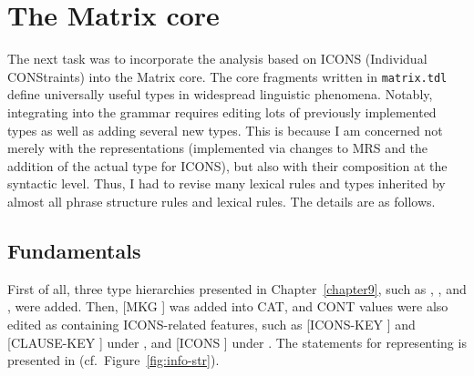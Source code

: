 \section{The Matrix core}
\label{11:sec:matrix}




The next task was to incorporate the analysis based on ICONS
(Individual CONStraints) into the Matrix
core. The core  fragments written in \texttt{matrix.tdl}
define universally useful types in widespread linguistic phenomena.
Notably, integrating  into the grammar requires editing
lots of previously implemented types as well as adding several new
types. This is because I am concerned not merely with the
representations (implemented via changes to MRS and the addition of
the actual type for ICONS), but also with their composition at
the syntactic level.  Thus, I had to revise many lexical rules and
types inherited by almost all phrase structure rules and lexical
rules.  The details are as follows.




\subsection{Fundamentals}
\label{11:ssec:fundamentals}


First of all, three type hierarchies presented in
Chapter~\ref{chapter9}, such as , , and
, were
added.
Then, [MKG ] was added into CAT, and CONT values were also
edited as containing ICONS-related features, such as [ICONS-KEY
  ] and [CLAUSE-KEY ] under , and
[ICONS ] under . The  statements for
representing  is presented in 
(cf.\ Figure~\ref{fig:info-str}).






